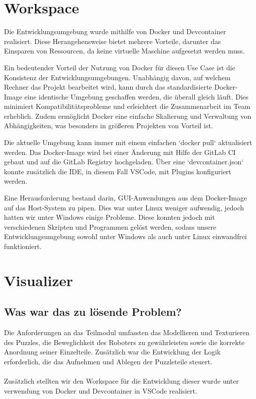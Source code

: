 \graphicspath{{sections/visualize/images/}}
\section[Workspace]{Workspace }
Die Entwicklungsumgebung wurde mithilfe von Docker und Devcontainer realisiert. Diese Herangehensweise bietet mehrere Vorteile, darunter das Einsparen von Ressourcen, da keine virtuelle Maschine aufgesetzt werden muss. 

Ein bedeutender Vorteil der Nutzung von Docker für diesen Use Case ist die Konsistenz der Entwicklungsumgebungen. Unabhängig davon, auf welchem Rechner das Projekt bearbeitet wird, kann durch das standardisierte Docker-Image eine identische Umgebung geschaffen werden, die überall gleich läuft. Dies minimiert Kompatibilitätsprobleme und erleichtert die Zusammenarbeit im Team erheblich. Zudem ermöglicht Docker eine einfache Skalierung und Verwaltung von Abhängigkeiten, was besonders in größeren Projekten von Vorteil ist.

Die aktuelle Umgebung kann immer mit einem einfachen `docker pull` aktualisiert werden. Das Docker-Image wird bei einer Änderung mit Hilfe der GitLab CI gebaut und auf die GitLab Registry hochgeladen. Über eine `devcontainer.json` konnte zusätzlich die IDE, in diesem Fall VSCode, mit Plugins konfiguriert werden.

Eine Herausforderung bestand darin, GUI-Anwendungen aus dem Docker-Image auf das Host-System zu pipen. Dies war unter Linux weniger aufwendig, jedoch hatten wir unter Windows einige Probleme. Diese konnten jedoch mit verschiedenen Skripten und Programmen gelöst werden, sodass unsere Entwicklungsumgebung sowohl unter Windows als auch unter Linux einwandfrei funktioniert.

\section{Visualizer}
\subsection{Was war das zu lösende Problem?}
Die Anforderungen an das Teilmodul umfassten das Modellieren und Texturieren des Puzzles, die Beweglichkeit des Roboters zu gewährleisten sowie die korrekte Anordnung seiner Einzelteile. Zusätzlich war die Entwicklung der Logik erforderlich, die das Aufnehmen und Ablegen der Puzzleteile steuert.\\
\\
Zusätzlich stellten wir den Workspace für die Entwicklung dieser wurde unter verwendung von Docker und Devcontainer in VSCode realisiert.\\

